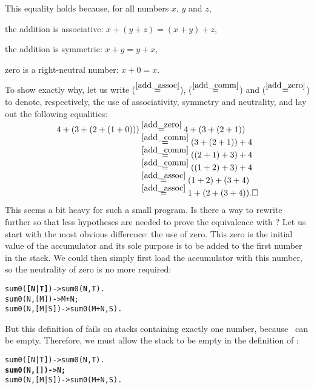 This equality holds because, for all numbers \(x\), \(y\) and
\(z\),\label{proof_sum}
\begin{enumerate*}

  \item \label{add_assoc} the addition is associative: \(x + (y + z) =
    (x + y) + z\),

  \item \label{add_comm} the addition is symmetric: \(x + y = y +
    x\),

  \item \label{add_zero} zero is a right\hyp{}neutral number: \(x+0 =
    x\).

\end{enumerate*}
To show exactly why, let us write (\(\mathrel{\stackrel{\smash{\ref{add_assoc}}}{=}}\)),
(\(\mathrel{\stackrel{\smash{\ref{add_comm}}}{=}}\)) and (\(\mathrel{\stackrel{\smash{\ref{add_zero}}}{=}}\)) to denote,
respectively, the use of associativity, symmetry and neutrality, and
lay out the following equalities:
\begin{align*}
4 + (3 + (2 + (1 + 0)))
  &\eqn{\smash{\ref{add_zero}}}  4 + (3 + (2 + 1))\\
  &\eqn{\smash{\ref{add_comm}}}  (3 + (2 + 1)) + 4\\
  &\eqn{\smash{\ref{add_comm}}}  ((2 + 1) + 3) + 4\\
  &\eqn{\smash{\ref{add_comm}}}  ((1 + 2) + 3) + 4\\
  &\eqn{\smash{\ref{add_assoc}}} (1 + 2) + (3 + 4)\\
  &\eqn{\smash{\ref{add_assoc}}} 1 + (2 + (3 + 4)).\hfill\Box
\end{align*}
This seems a bit heavy for such a small program. Is there a way to
rewrite further  so that less hypotheses are needed
to prove the equivalence with ? Let us start with the
most obvious difference: the use of zero. This zero is the initial
value of the accumulator and its sole purpose is to be added to the
first number in the stack. We could then simply first load the
accumulator with this number, so the neutrality of zero is no more
required:
\begin{alltt}
sum0(\textbf{[N|T]})   -> sum0(\textbf{N},T).
sum0(N,[M])   -> M+N;
sum0(N,[M|S]) -> sum0(M+N,S).
\end{alltt}
But this definition of  fails on stacks containing
exactly one number, because ~can be empty. Therefore, we
must allow the stack to be empty in the definition of
:
\begin{alltt}
sum0([N|T])   -> sum0(N,T).
\textbf{sum0(N,   []) -> N;}
sum0(N,[M|S]) -> sum0(M+N,S).
\end{alltt}
